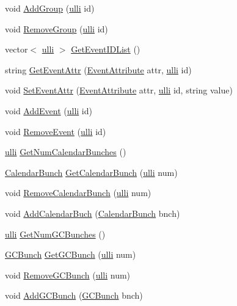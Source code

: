 \begin{DoxyCompactItemize}
\item 
void \hyperlink{classRDataStorage_af51bae1b455ef472ed4e96676d622f54}{AddGroup} (\hyperlink{DataStorage_8h_afebafa022413aaef27ce1b01cbfa9791}{ulli} id)
\item 
void \hyperlink{classRDataStorage_a070f2de5846fbcbb1500c2d90ce7c8de}{RemoveGroup} (\hyperlink{DataStorage_8h_afebafa022413aaef27ce1b01cbfa9791}{ulli} id)
\item 
vector$<$ \hyperlink{DataStorage_8h_afebafa022413aaef27ce1b01cbfa9791}{ulli} $>$ \hyperlink{classRDataStorage_a8293e9dcf1a31661d8ebbfaea9b080c0}{GetEventIDList} ()
\item 
string \hyperlink{classRDataStorage_a93f2acaf70fa9bf0c0cf2a7e73e127ef}{GetEventAttr} (\hyperlink{DataStorage_8h_af6563a486af2737f53e7c3fb908c2682}{EventAttribute} attr, \hyperlink{DataStorage_8h_afebafa022413aaef27ce1b01cbfa9791}{ulli} id)
\item 
void \hyperlink{classRDataStorage_a8592067b6783ed5e7a8c99ffd69c10e6}{SetEventAttr} (\hyperlink{DataStorage_8h_af6563a486af2737f53e7c3fb908c2682}{EventAttribute} attr, \hyperlink{DataStorage_8h_afebafa022413aaef27ce1b01cbfa9791}{ulli} id, string value)
\item 
void \hyperlink{classRDataStorage_a65553d11d4449d1c1953dd347a0e6a25}{AddEvent} (\hyperlink{DataStorage_8h_afebafa022413aaef27ce1b01cbfa9791}{ulli} id)
\item 
void \hyperlink{classRDataStorage_aa39e9cb5f5ce7f8cce30f06deecaf781}{RemoveEvent} (\hyperlink{DataStorage_8h_afebafa022413aaef27ce1b01cbfa9791}{ulli} id)
\item 
\hyperlink{DataStorage_8h_afebafa022413aaef27ce1b01cbfa9791}{ulli} \hyperlink{classRDataStorage_ad6a13ddd8ddac578ad516b6f774a7f0d}{GetNumCalendarBunches} ()
\item 
\hyperlink{structCalendarBunch}{CalendarBunch} \hyperlink{classRDataStorage_af6a5d06eedeec02f4ecd4ce30be22044}{GetCalendarBunch} (\hyperlink{DataStorage_8h_afebafa022413aaef27ce1b01cbfa9791}{ulli} num)
\item 
void \hyperlink{classRDataStorage_a9d25c3b8a218d71f533aacdbe336fa7f}{RemoveCalendarBunch} (\hyperlink{DataStorage_8h_afebafa022413aaef27ce1b01cbfa9791}{ulli} num)
\item 
void \hyperlink{classRDataStorage_a9e72a4e2b404237d9fd773a870291fc3}{AddCalendarBuch} (\hyperlink{structCalendarBunch}{CalendarBunch} bnch)
\item 
\hyperlink{DataStorage_8h_afebafa022413aaef27ce1b01cbfa9791}{ulli} \hyperlink{classRDataStorage_a384e78b24a0bedd05fa313f7f380f528}{GetNumGCBunches} ()
\item 
\hyperlink{structGCBunch}{GCBunch} \hyperlink{classRDataStorage_a17464d08ca3d3405cdc26dc2badc3b09}{GetGCBunch} (\hyperlink{DataStorage_8h_afebafa022413aaef27ce1b01cbfa9791}{ulli} num)
\item 
void \hyperlink{classRDataStorage_aee498a2d2d9a5b8f737d11d367d20895}{RemoveGCBunch} (\hyperlink{DataStorage_8h_afebafa022413aaef27ce1b01cbfa9791}{ulli} num)
\item 
void \hyperlink{classRDataStorage_a674e0aa52ece2810572e6115ecf9ffce}{AddGCBunch} (\hyperlink{structGCBunch}{GCBunch} bnch)
\end{DoxyCompactItemize}
